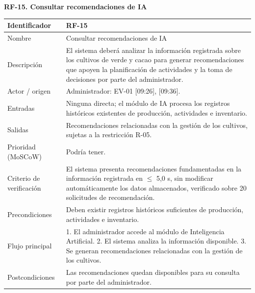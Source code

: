 \documentclass[12pt,a4paper]{article}
\begin{document}
\begin{minipage}{\linewidth}
\bigskip
\noindent\textbf{RF-15. Consultar recomendaciones de IA}
\label{tab:RF-15}

\begin{center}
\begin{tabular}{|p{3.5cm}|p{10.7cm}|}
\hline
Identificador & RF-15 \\
\hline
Nombre & Consultar recomendaciones de IA \\
\hline
Descripción & El sistema deberá analizar la información registrada sobre los cultivos de verde y cacao para generar recomendaciones que apoyen la planificación de actividades y la toma de decisiones por parte del administrador. \\
\hline
Actor / origen & Administrador: EV-01 [09:26], [09:36]. \\
\hline
Entradas & Ninguna directa; el módulo de IA procesa los registros históricos existentes de producción, actividades e inventario. \\
\hline
Salidas & Recomendaciones relacionadas con la gestión de los cultivos, sujetas a la restricción R-05. \\
\hline
Prioridad (MoSCoW) & Podría tener. \\
\hline
Criterio de verificación & El sistema presenta recomendaciones fundamentadas en la información registrada en $\leq$ 5,0 s, sin modificar automáticamente los datos almacenados, verificado sobre 20 solicitudes de recomendación. \\
\hline
Precondiciones & Deben existir registros históricos suficientes de producción, actividades e inventario. \\
\hline
Flujo principal & 1. El administrador accede al módulo de Inteligencia Artificial. 2. El sistema analiza la información disponible. 3. Se generan recomendaciones relacionadas con la gestión de los cultivos. \\
\hline
Postcondiciones & Las recomendaciones quedan disponibles para su consulta por parte del administrador. \\
\hline
\end{tabular}
\end{center}
\end{minipage}
\end{document}
